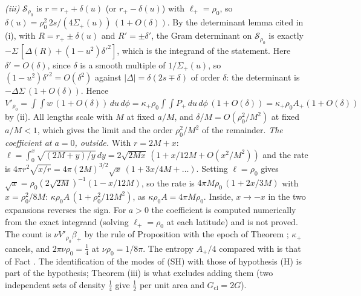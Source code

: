 \emph{(iii)} $\mathcal{S}_{\rho_0}$ is $r = r_+ + \delta(u)$ (or $r_+ - \delta(u)$) with $\ell_+ = \rho_0$, so $\delta(u) = \rho_0^2\,2s/(4\Sigma_+(u))\,(1 + O(\delta))$. By the determinant lemma cited in (i), with $R = r_+ \pm \delta(u)$ and $R' = \pm\delta'$, the Gram determinant on $\mathcal{S}_{\rho_0}$ is exactly $-\Sigma\,[\Delta(R) + (1-u^2)\delta'^2]$, which is the integrand of the statement. Here $\delta' = O(\delta)$, since $\delta$ is a smooth multiple of $1/\Sigma_+(u)$, so $(1-u^2)\delta'^2 = O(\delta^2)$ against $|\Delta| = \delta(2s \mp \delta)$ of order $\delta$: the determinant is $-\Delta\Sigma\,(1 + O(\delta))$. Hence $V'_{\rho_0} = \int\!\!\int w\,(1 + O(\delta))\,du\,d\phi = \kappa_+\rho_0\int\!\!\int P_+\,du\,d\phi\,(1 + O(\delta)) = \kappa_+\rho_0A_+(1 + O(\delta))$ by (ii). All lengths scale with $M$ at fixed $a/M$, and $\delta/M = O(\rho_0^2/M^2)$ at fixed $a/M < 1$, which gives the limit and the order $\rho_0^2/M^2$ of the remainder. \emph{The coefficient at $a = 0$, outside.} With $r = 2M + x$: $\ell = \int_0^x\sqrt{(2M + y)/y}\,dy = 2\sqrt{2Mx}\,(1 + x/12M + O(x^2/M^2))$ and the rate is $4\pi r^2\sqrt{x/r} = 4\pi(2M)^{3/2}\sqrt{x}\,(1 + 3x/4M + \ldots)$. Setting $\ell = \rho_0$ gives $\sqrt{x} = \rho_0(2\sqrt{2M})^{-1}(1 - x/12M)$, so the rate is $4\pi M\rho_0\,(1 + 2x/3M)$ with $x = \rho_0^2/8M$: $\kappa\rho_0A\,(1 + \rho_0^2/12M^2)$, as $\kappa\rho_0A = 4\pi M\rho_0$. Inside, $x \to -x$ in the two expansions reverses the sign. For $a > 0$ the coefficient is computed numerically from the exact integrand (solving $\ell_+ = \rho_0$ at each latitude) and is not proved. The count is $\nu V'_{\rho_0}\beta_+$ by the rule of Proposition  with the epoch of Theorem ; $\kappa_+$ cancels, and $2\pi\nu\rho_0 = \tfrac14$ at $\nu\rho_0 = 1/8\pi$. The entropy $A_+/4$ compared with is that of Fact . The identification of the modes of (SH) with those of hypothesis (H) is part of the hypothesis; Theorem (iii) is what excludes adding them (two independent sets of density $\tfrac14$ give $\tfrac12$ per unit area and $G_{\mathrm{cl}} = 2G$).

